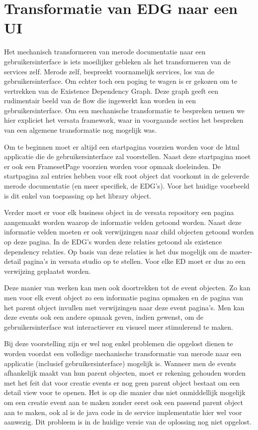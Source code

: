 \section{Transformatie van EDG naar een UI}
\label{sec:E2UI}
Het mechanisch transformeren van merode documentatie naar een gebruikersinterface is iets moeilijker gebleken als het transformeren
van de services zelf. Merode zelf, bespreekt voornamelijk services, los van de gebruikersinterface.
Om echter toch een poging te wagen is er gekozen om te vertrekken van de Existence Dependency Graph. 
Deze graph geeft een rudimentair beeld van de flow die ingewerkt kan worden in een gebruikersinterface. 
Om een mechanische transformatie te bespreken nemen we hier expliciet het versata framework, waar in voorgaande secties het bespreken van een algemene transformatie nog mogelijk was.

Om te beginnen moet er altijd een startpagina voorzien worden voor de html applicatie die de gebruikersinterface zal voorstellen.
Naast deze startpagina moet er ook een FramesetPage voorzien worden voor opmaak doeleinden.
De startpagina zal entries hebben voor elk root object dat voorkomt in de geleverde merode documentatie (en meer specifiek, de EDG's).
Voor het huidige voorbeeld is dit enkel van toepassing op het library object.

Verder moet er voor elk business object in de versata repository een pagina aangemaakt worden waarop de informatie velden getoond worden.
Naast deze informatie velden moeten er ook verwijzingen naar child objecten getoond worden op deze pagina. 
In de EDG's worden deze relaties getoond als existence dependency relaties. Op basis van deze relaties is het dus mogelijk om 
de master-detail pagina's in versata studio op te stellen. Voor elke ED moet er dus zo een verwijzing geplaatst worden.

Deze manier van werken kan men ook doortrekken tot de event objecten. Zo kan men voor elk event object zo een informatie pagina opmaken en de pagina van het parent object invullen met verwijzingen naar deze event pagina's. 
Men kan deze events ook een andere opmaak geven, indien gewenst, om de gebruikersinterface wat interactiever en visueel meer stimulerend te maken.

Bij deze voorstelling zijn er wel nog enkel problemen die opgelost dienen te worden voordat een volledige mechanische transformatie van merode naar een applicatie (inclusief gebruikersinterface) mogelijk is. 
Wanneer men de events afhankelijk maakt van hun parent objecten, moet er rekening gehouden worden met het feit dat voor creatie events er nog geen parent object bestaat om een detail view voor te openen. 
Het is op die manier dus niet onmiddellijk mogelijk om een creatie event aan te maken zonder eerst ook een passend parent object aan te maken, ook al is de java code in de service implementatie hier wel voor aanwezig. 
Dit probleem is in de huidige versie van de oplossing nog niet opgelost.

